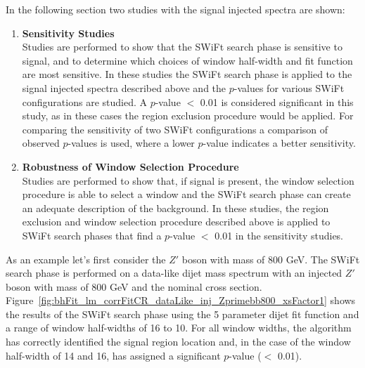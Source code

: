 \noindent
In the following section two studies with the signal injected spectra are shown:
\begin{enumerate}
  \item\textbf{Sensitivity Studies}\\
  Studies are performed to show that the SWiFt search phase is sensitive to signal,
  and to determine which choices of window half-width and fit function are most sensitive.
  In these studies the SWiFt search phase is applied to the signal injected spectra described above and
  the \bh{} \mbox{$p$-value}s for various SWiFt configurations are studied.
  A \mbox{$p$-value} $<$ 0.01 is considered significant in this study,
  as in these cases the region exclusion procedure would be applied.
  For comparing the sensitivity of two SWiFt configurations a comparison of
  observed \bh{} \mbox{$p$-value}s is used, where a lower \mbox{$p$-value} indicates a better sensitivity.\vspace{1em}
  
  \item\textbf{Robustness of Window Selection Procedure}\\
    Studies are performed to show that, if signal is present, the window selection procedure is able to select a window and
    the SWiFt search phase can create an adequate description of the background.
    In these studies, the region exclusion and window selection procedure described above is applied
    to SWiFt search phases that find a \bh{} \mbox{$p$-value} $<$ 0.01 in the sensitivity studies.
\end{enumerate}




As an example let's first consider the $Z'$ boson with mass of 800 GeV.
The SWiFt search phase is performed on a data-like dijet mass spectrum
with an injected  $Z'$ boson with mass of 800 GeV and the nominal cross section.
Figure~\ref{fig:bhFit_lm_corrFitCR_dataLike_inj_Zprimebb800_xsFactor1}
shows the results of the SWiFt search phase
using the 5 parameter dijet fit function and a range of window half-widths of 16 to 10.
For all window widths, the \bh{} algorithm has correctly identified the signal region location
and, in the case of the window half-width of 14 and 16, has assigned a significant \mbox{\mbox{$p$-value}} ($<$ 0.01).

